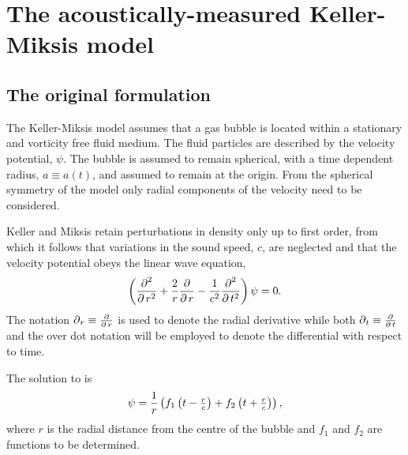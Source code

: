 

\section{The acoustically-measured Keller-Miksis model}
\subsection{The original formulation}\label{sec:KMoriginal}
The Keller-Miksis model\cite{Keller1980}  assumes that a gas bubble is located within a stationary and vorticity free fluid medium.
The fluid particles are described by the velocity potential, $\psi$.
The  bubble is assumed to remain spherical, with a  time dependent radius, $a \equiv a(t)$,
and assumed to remain at the origin.
From the spherical symmetry of the model only radial components of the velocity need to be considered. 

Keller and Miksis retain perturbations in density only up to first order, from which it follows that variations in the sound speed, $c$, are neglected
and that the velocity potential obeys the linear wave equation,
\begin{align}
\label{eqn:WaveEqn}
\left( \frac{\operatorname{\partial}^2}{\operatorname{\partial} r^2} + \frac{2}{r}\frac{\operatorname{\partial}}{\operatorname{\partial} r} - \frac{1}{c^2}\frac{\operatorname{\partial}^2}{\operatorname{\partial} t^2} \right) \psi = 0.
\end{align}
The notation ${\operatorname{\partial}_r} \equiv\frac{\operatorname{\partial}}{\operatorname{\partial} r}$ is used to denote the radial derivative
while both  $\operatorname{\partial}_t \equiv \frac{\operatorname{\partial}}{\operatorname{\partial} t}$ and the over dot notation will be employed to denote the differential with respect to time.

The solution to  is
\begin{align}
  \label{eqn:Ansatz}
  \psi = \frac{1}{r}\left( f_1\left( t-\tfrac{r}{c} \right) + f_2\left( t+\tfrac{r}{c} \right) \right),
\end{align}
where $r$ is the radial distance from the centre of the bubble
and $f_1$ and $f_2$ are functions to be determined.

